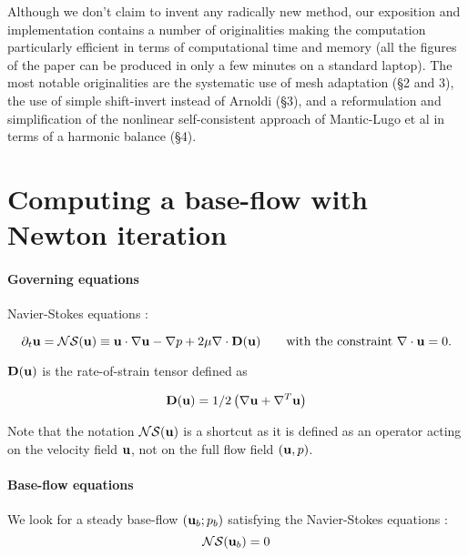 \documentclass{elsarticle}
\newcommand{\be}[1]{ \begin{equation} \label{#1}}
\newcommand{\ee}{\end{equation}}
\begin{document}
Although we don't claim to invent any radically new method, our exposition and implementation contains a number of originalities making the computation particularly efficient in terms of computational time and memory (all the figures of the paper can be produced in only a few minutes on a standard laptop). The most notable originalities are the systematic use of mesh adaptation (\S 2 and 3), the use of simple shift-invert instead of Arnoldi (\S 3), and a reformulation and simplification of the nonlinear self-consistent approach of Mantic-Lugo et al in terms of a harmonic balance (\S 4).
 



\section{Computing a base-flow with Newton iteration}

\paragraph{Governing equations}

Navier-Stokes equations :

\be{NSprimitive}
\partial_t {\bf u} = {\cal NS} ({\bf u})
\equiv {\bf u} \cdot \nabla {\bf u} - \nabla p + 2 \mu \nabla \cdot {\bf D}({\bf u}) 
 \qquad \mbox{with the constraint } \nabla \cdot {\bf u} = 0.
\ee

$ {\bf D}({\bf u}) $ is the rate-of-strain tensor defined as

$$
 {\bf D}({\bf u}) = 1/2
\left( \nabla {\bf u} +  \nabla^T  {\bf u}\right)
$$

Note that the notation ${\cal NS} ({\bf u})$ is a shortcut as it is defined as an operator acting on the velocity field ${\bf u}$, not on the full flow field $({\bf u},p)$. 






\paragraph{Base-flow equations}
We look for a steady base-flow $({\bf u}_b;p_b)$ satisfying the Navier-Stokes equations :
\be{NSb}
{\cal NS} ({\bf u}_b) = 0
\ee
\end{document}
